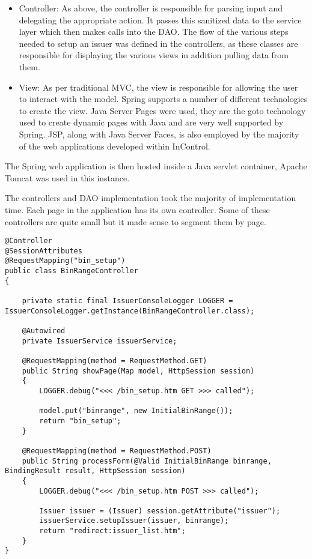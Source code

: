\documentclass[a4paper, 11pt, titlepage]{article}
\begin{document}
\begin{itemize}
\item Controller: As above, the controller is responsible for parsing input and delegating the appropriate action. It passes this sanitized data to the service layer which then makes calls into the DAO. The flow of the various steps needed to setup an issuer was defined in the controllers, as these classes are responsible for displaying the various views in addition pulling data from them.
\item View: As per traditional MVC, the view is responsible for allowing the user to interact with the model. Spring supports a number of different technologies to create the view. Java Server Pages were used, they are the goto technology used to create dynamic pages with Java and are very well supported by Spring. JSP, along with Java Server Faces, is also employed by the majority of the web applications developed within InControl.
\end{itemize}

The Spring web application is then hosted inside a Java servlet container, Apache Tomcat was used in this instance.

The controllers and DAO implementation took the majority of implementation time. Each page in the application has its own controller. Some of these controllers are quite small but it made sense to segment them by page. 

\begin{verbatim}
@Controller
@SessionAttributes
@RequestMapping("bin_setup")
public class BinRangeController
{

    private static final IssuerConsoleLogger LOGGER = IssuerConsoleLogger.getInstance(BinRangeController.class);

    @Autowired
    private IssuerService issuerService;

    @RequestMapping(method = RequestMethod.GET)
    public String showPage(Map model, HttpSession session)
    {
        LOGGER.debug("<<< /bin_setup.htm GET >>> called");

        model.put("binrange", new InitialBinRange());
        return "bin_setup";
    }

    @RequestMapping(method = RequestMethod.POST)
    public String processForm(@Valid InitialBinRange binrange, BindingResult result, HttpSession session)
    {
        LOGGER.debug("<<< /bin_setup.htm POST >>> called");

        Issuer issuer = (Issuer) session.getAttribute("issuer");
        issuerService.setupIssuer(issuer, binrange);
        return "redirect:issuer_list.htm";
    }
}


\end{verbatim}
\end{document}
